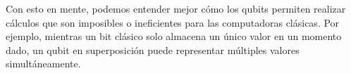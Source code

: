\noindent
Con esto en mente, podemos entender mejor cómo los qubits permiten realizar cálculos que son imposibles o ineficientes para las computadoras clásicas. Por ejemplo, mientras un bit clásico solo almacena un único valor en un momento dado, un qubit en superposición puede representar múltiples valores simultáneamente.